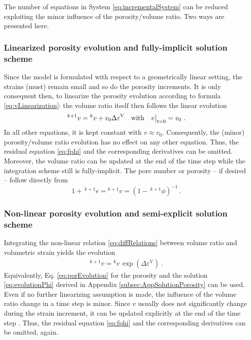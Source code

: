 \documentclass[paper=a4, twoside, pagesize]{scrartcl}
\newcommand{\with}{\text{with}}
\newcommand{\minus}{-}
\newcommand{\inv}{{-1}}
\begin{document}
The number of equations in System \eqref{eq:incrementalSystem} can be reduced exploiting the minor influence of the porosity/volume ratio. Two ways are presented here.

\subsubsection{Linearized porosity evolution and fully-implicit solution scheme}

Since the model is formulated with respect to a geometrically linear setting, the strains (must) remain small and so do the porosity increments. It is only consequent then, to linearize the porosity evolution according to formula \eqref{eq:vLinearization}: the volume ratio itself then follows the linear evolution
\begin{equation}
  {}^{k+1}v = {}^{k}v + v_0 \Delta\varepsilon^\text{V} 
  \quad\with\quad v\big{|}_{t=0} = v_{0} \ .
\end{equation}
In all other equations, it is kept constant with $v\approx v_0$. Consequently, the (minor) porosity/volume ratio evolution has no effect on any other equation. Thus, the residual equation \eqref{eq:fphi} and the corresponding derivatives can be omitted. Moreover, the volume ratio can be updated at the end of the time step while the integration scheme still is fully-implicit.
The pore number or porosity -- if desired -- follow directly from
\begin{equation}
  1 + \,{}^{k+1}\!e = {}^{k+1}\!v = (1-\, {}^{k+1}\!\phi)^{\inv} 
   \ .
\end{equation}

\subsubsection{Non-linear porosity evolution and semi-explicit solution scheme}

Integrating the non-linear relation \eqref{eq:diffRelations} between volume ratio and volumetric strain yields the evolution
\begin{align}
  {}^{k+1}\!v = {}^{k}\!v\, \exp(\Delta\varepsilon^\text{V}) \ .
\end{align}
Equivalently, Eq. \eqref{eq:porEvolution} for the porosity and the solution \eqref{eq:evolutionPhi} derived in Appendix \ref{subsec:AppSolutionPorosity} can be used. Even if no further linearizing assumption is made, the influence of the volume ratio change in a  time step is minor. Since $v$ usually does not significantly change during the strain increment, it can be updated explicitly at the end of the time step \cite{Borja1990}. Thus, the residual equation \eqref{eq:fphi} and the corresponding derivatives can be omitted, again.
\end{document}
